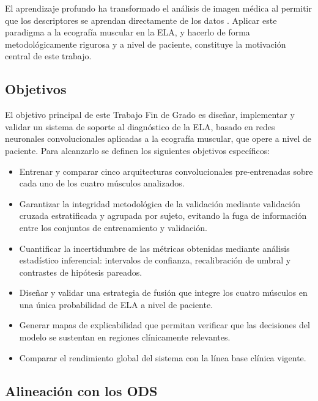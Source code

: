 \documentclass[12pt]{extarticle}
\numberwithin{equation}{section}
\begin{document}
\begin{refsection}
El aprendizaje profundo ha transformado el an\'alisis de imagen m\'edica al permitir que los descriptores se aprendan directamente de los datos \cite{litjens2017survey}. Aplicar este paradigma a la ecograf\'ia muscular en la ELA, y hacerlo de forma metodol\'ogicamente rigurosa y a nivel de paciente, constituye la motivaci\'on central de este trabajo.

\subsection{Objetivos}

El objetivo principal de este Trabajo Fin de Grado es dise\~nar, implementar y validar un sistema de soporte al diagn\'ostico de la ELA, basado en redes neuronales convolucionales aplicadas a la ecograf\'ia muscular, que opere a nivel de paciente. Para alcanzarlo se definen los siguientes objetivos espec\'ificos:

\begin{itemize}
    \item Entrenar y comparar cinco arquitecturas convolucionales pre-entrenadas sobre cada uno de los cuatro m\'usculos analizados.
    \item Garantizar la integridad metodol\'ogica de la validaci\'on mediante validaci\'on cruzada estratificada y agrupada por sujeto, evitando la fuga de informaci\'on entre los conjuntos de entrenamiento y validaci\'on.
    \item Cuantificar la incertidumbre de las m\'etricas obtenidas mediante an\'alisis estad\'istico inferencial: intervalos de confianza, recalibraci\'on de umbral y contrastes de hip\'otesis pareados.
    \item Dise\~nar y validar una estrategia de fusi\'on que integre los cuatro m\'usculos en una \'unica probabilidad de ELA a nivel de paciente.
    \item Generar mapas de explicabilidad que permitan verificar que las decisiones del modelo se sustentan en regiones cl\'inicamente relevantes.
    \item Comparar el rendimiento global del sistema con la l\'inea base cl\'inica vigente.
\end{itemize}

\subsection{Alineaci\'on con los ODS}


\end{refsection}
\end{document}
